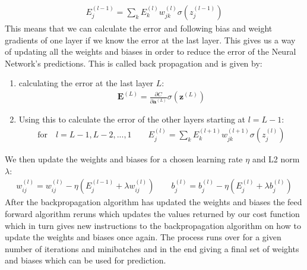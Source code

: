 \documentclass[11pt]{article}
\begin{document}
\begin{align*}
    E^{(l-1)}_j = \sum_k E^{(l)}_k w_{jk}^{(l)}\sigma(z_j^{(l-1)})
\end{align*}
This means that we can calculate the error and following bias and weight gradients of one layer if we know the error at the last layer. This gives us a way of updating all the weights and biases in order to reduce the error of the Neural Network's predictions. This is called back propagation and is given by:
\begin{enumerate}
    \item calculating the error at the last layer $L$:
          \begin{align*}
              \boldsymbol{E}^{(L)} = \frac{\partial C }{\partial \boldsymbol{a}^{(L)}} \sigma(\boldsymbol{z}^{(L)})
          \end{align*}
    \item Using this to calculate the error of the other layers starting at $l=L-1$:
          \begin{align*}
              \text{for}\quad  l=L-1, L-2,...,1 \quad\quad
              E_j^{(l)} = \sum_k E^{(l+1)}_k w_{jk}^{(l+1)} \sigma(z_j^{(l)})
          \end{align*}
\end{enumerate}
We then update the weights and biases for a chosen learning rate $\eta$ and L2 norm $\lambda$:
\begin{align*}
    w^{(l)}_{ij} = w^{(l)}_{ij} - \eta(E_j^{(l-1)}  + \lambda w_{ij}^{(l)}) \quad\quad b_j^{(l)} = b_j^{(l)} - \eta(E_j^{(l)} + \lambda b_j^{(l)})
\end{align*}
After the backpropagation algorithm has updated the weights and biases the feed forward algorithm reruns which updates the values returned by our cost function which in turn gives new instructions to the backpropagation algorithm on how to update the weights and biases once again. The process runs over for a given number of iterations and minibatches and in the end giving a final set of weights and biases which can be used for prediction.
\end{document}

